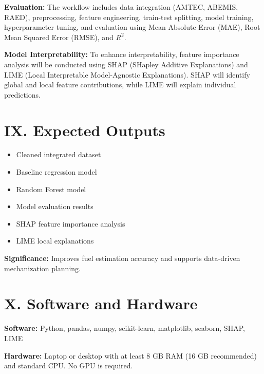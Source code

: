 \documentclass[11pt,twocolumn]{article}
\begin{document}
\vspace{10pt}

\textbf{Evaluation:} The workflow includes data integration (AMTEC, ABEMIS, RAED), preprocessing, feature engineering, train-test splitting, model training, hyperparameter tuning, and evaluation using Mean Absolute Error (MAE), Root Mean Squared Error (RMSE), and $R^2$.

\vspace{10pt}

\textbf{Model Interpretability:} To enhance interpretability, feature importance analysis will be conducted using SHAP (SHapley Additive Explanations) and LIME (Local Interpretable Model-Agnostic Explanations). SHAP will identify global and local feature contributions, while LIME will explain individual predictions.

\section*{IX. Expected Outputs}

\vspace{10pt}

\begin{itemize}
\item Cleaned integrated dataset
\item Baseline regression model
\item Random Forest model
\item Model evaluation results
\item SHAP feature importance analysis
\item LIME local explanations
\end{itemize}

\vspace{10pt}

\textbf{Significance:} Improves fuel estimation accuracy and supports data-driven mechanization planning.

\section*{X. Software and Hardware}

\vspace{10pt}

\textbf{Software:} Python, pandas, numpy, scikit-learn, matplotlib, seaborn, SHAP, LIME

\vspace{10pt}

\textbf{Hardware:} Laptop or desktop with at least 8 GB RAM (16 GB recommended) and standard CPU. No GPU is required.
\end{document}
